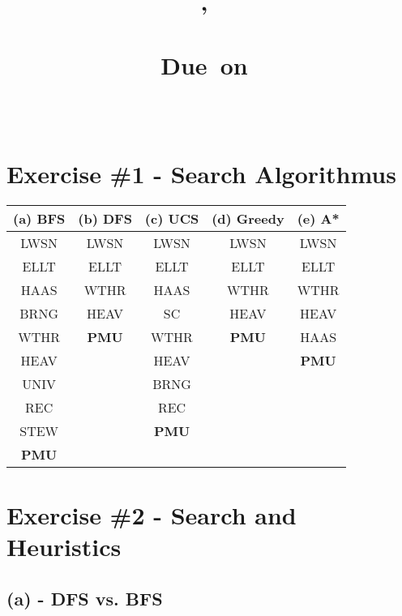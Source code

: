 \documentclass{article}
\title{\vspace{2in}\textmd{\textbf{\hmwkClass,\ \hmwkTitle \textit{\\\hmwkSubTitle}}}\\\normalsize\vspace{0.1in}\small{Due\ on\ \hmwkDueDate}\\\vspace{0.1in}\large{\textit{\hmwkClassInstructor\ }}\vspace{3in}}
\date{}
\author{\textbf{\hmwkAuthorName}}
\begin{document}
\begin{spacing}{1.2}
\maketitle
\newpage
\tableofcontents

\newpage 

\section{Exercise \#1 - Search Algorithmus}

\begin{center}
 \begin{tabular}{|c|c|c|c|c|} 
 \hline
 (a) BFS  & (b) DFS & (c) UCS & (d) Greedy  & (e) A*\\ [1ex] 
 \hline\hline
 LWSN & LWSN & LWSN & LWSN & LWSN \\ 
 \hline
 ELLT & ELLT & ELLT & ELLT & ELLT \\ 
 \hline
 HAAS & WTHR & HAAS & WTHR & WTHR \\ 
 \hline
 BRNG & HEAV & SC & HEAV & HEAV \\ 
 \hline
 WTHR & \textbf{PMU} & WTHR & \textbf{PMU} & HAAS \\ 
 \hline
 HEAV &   & HEAV &  &  \textbf{PMU} \\ 
 \hline
 UNIV &  & BRNG &  &  \\ 
 \hline
 REC &   & REC &  &  \\ 
 \hline
 STEW &   &  \textbf{PMU} &  &  \\ 
 \hline
 \textbf{PMU} &  &  &  &  \\ 
 \hline
\end{tabular}
\end{center}

\section{Exercise \#2 - Search and Heuristics}


\subsection{(a) - DFS vs. BFS }


\end{spacing}
\end{document}
